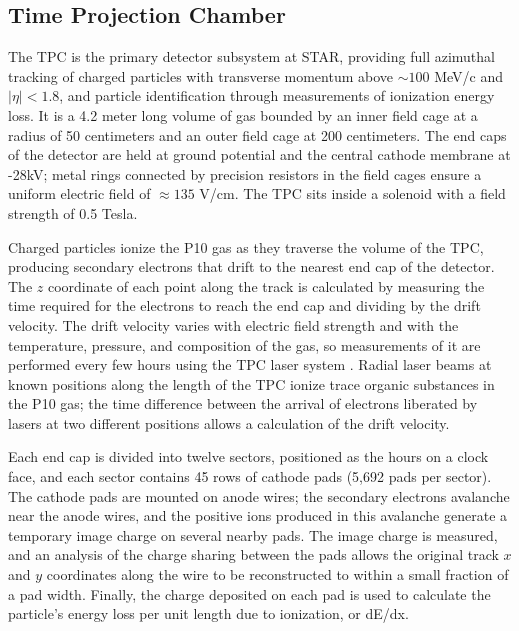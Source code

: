 \subsection{Time Projection Chamber}

The TPC \cite{Anderson:2003ur} is the primary detector subsystem at STAR,
providing full azimuthal tracking of charged particles with transverse
momentum above $\sim 100$ MeV/c and $|\eta| < 1.8$, and particle
identification through measurements of ionization energy loss. It is a 4.2
meter long volume of gas bounded by an inner field cage at a radius of 50
centimeters and an outer field cage at 200 centimeters. The end caps of the
detector are held at ground potential and the central cathode membrane at
-28kV; metal rings connected by precision resistors in the field cages ensure
a uniform electric field of $\approx 135$ V/cm. The TPC sits inside a solenoid
with a field strength of 0.5 Tesla.

Charged particles ionize the P10 gas as they traverse the volume of the TPC,
producing secondary electrons that drift to the nearest end cap of the
detector. The $z$ coordinate of each point along the track is calculated by
measuring the time required for the electrons to reach the end cap and
dividing by the drift velocity. The drift velocity varies with electric field
strength and with the temperature, pressure, and composition of the gas, so
measurements of it are performed every few hours using the TPC laser system
\cite{Abele:2003aa}. Radial laser beams at known positions along the length of
the TPC ionize trace organic substances in the P10 gas; the time difference
between the arrival of electrons liberated by lasers at two different
positions allows a calculation of the drift velocity.

Each end cap is divided into twelve sectors, positioned as the hours on a
clock face, and each sector contains 45 rows of cathode pads (5,692 pads per
sector). The cathode pads are mounted on anode wires; the secondary electrons
avalanche near the anode wires, and the positive ions produced in this
avalanche generate a temporary image charge on several nearby pads. The image
charge is measured, and an analysis of the charge sharing between the pads
allows the original track $x$ and $y$ coordinates along the wire to be
reconstructed to within a small fraction of a pad width. Finally, the charge
deposited on each pad is used to calculate the particle's energy loss per unit
length due to ionization, or dE/dx.

